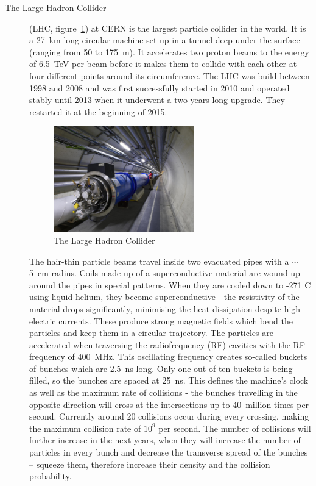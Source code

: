 \documentclass[twoside,12pt]{packages/mytustyle}  %
\begin{document}
\begin{description}
\item[The Large Hadron Collider]
(LHC, figure~\ref{fig:lhc}) at CERN is the largest particle collider in the world. It is a 27~km long circular machine set up in a tunnel deep under the surface (ranging from 50 to 175~m). It accelerates two proton beams to the energy of 6.5~TeV per beam before it makes them to collide with each other at four different points around its circumference. The LHC was build between 1998 and 2008 and was first successfully started in 2010 and operated stably until 2013 when it underwent a two years long upgrade. They restarted it at the beginning of 2015.
\begin{figure}[!t]
\centering
\includegraphics[width=0.6\textwidth]{pics/lhc}
\caption{The Large Hadron Collider \cite{Maximilien:1324852}}
\label{fig:lhc}
\end{figure}
The hair-thin particle beams travel inside two evacuated pipes with a $\sim$5~cm radius. Coils made up of a superconductive material are wound up around the pipes in special patterns. When they are cooled down to -271 \textdegree C using liquid helium, they become superconductive - the resistivity of the material drops significantly, minimising the heat dissipation despite high electric currents. These produce strong magnetic fields which bend the particles and keep them in a circular trajectory. The particles are accelerated when traversing the radiofrequency (RF) cavities with the RF frequency of 400~MHz. This oscillating frequency creates so-called buckets of bunches which are 2.5~ns long. Only one out of ten buckets is being filled, so the bunches are spaced at 25~ns. This defines the machine's clock as well as the maximum rate of collisions - the bunches travelling in the opposite direction will cross at the intersections up to 40~million times per second. Currently around 20 collisions occur during every crossing, making the maximum collision rate of $10^9$ per second. The number of collisions will further increase in the next years, when they will increase the number of particles in every bunch and decrease the transverse spread of the bunches -- squeeze them, therefore increase their density and the collision probability.
\end{description}
\end{document}
